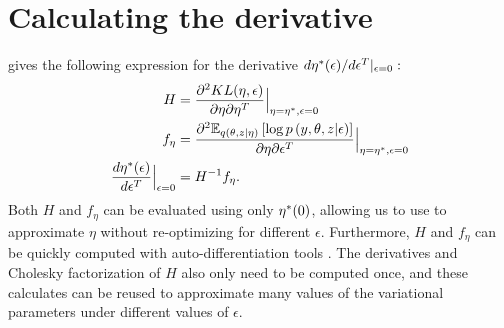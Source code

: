 

\section{Calculating the derivative}\label{app:sensitivity}

\citet[Theorem 2]{giordano:2017:covariances} gives
the following expression for
the derivative $d \eta^{*}(\epsilon)/ d\epsilon^T \vert_{\epsilon = 0}:$
%
\begin{align}
H &= \frac{\partial^2 KL(\eta, \epsilon)}{\partial \eta \partial \eta^T}
    \Big\rvert_{\eta = \eta^{*}, \epsilon = 0} \nonumber \\
f_\eta &= \frac{\partial^2
    \mathbb{E}_{q\left(\theta, z \vert \eta\right)}
        \left[ \log p\left(y, \theta, z \vert \epsilon \right)\right]
    } {\partial \eta \partial \epsilon^T}
    \Big\rvert_{\eta = \eta^{*}, \epsilon = 0}  \nonumber  \\
\frac{d \eta^{*}(\epsilon)}{d\epsilon^T}\Big|_{\epsilon=0} &=
    H^{-1} f_\eta. \label{eq:vb_sensitivty}
\end{align}
%
Both $H$ and $f_\eta$ can be evaluated using only $\eta^{*}(0)$, allowing us to
use  to approximate $\eta$ without re-optimizing
 for different $\epsilon$. Furthermore, $H$ and
$f_\eta$ can be quickly computed with auto-differentiation tools
\citep{maclaurin:2015:autograd}. The derivatives and Cholesky factorization of
$H$ also only need to be computed once, and these calculates can be reused to
approximate many values of the variational parameters under different
values of $\epsilon$.
